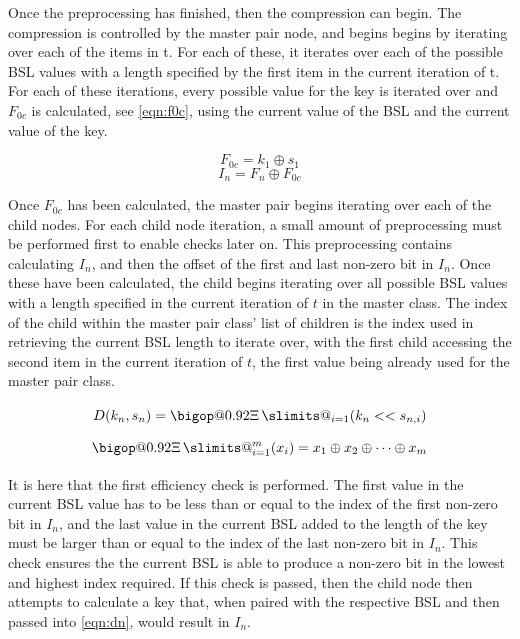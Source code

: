 \documentclass{hehe}
\makeatletter
\DeclareRobustCommand\bigop[2][1]{%
  \mathop{\vphantom{\sum}\mathpalette\bigop@{{#1}{#2}}}\slimits@
}
\newcommand{\bigop@}[2]{\bigop@@#1#2}
\newcommand{\bigop@@}[3]{%
  \vcenter{%
    \sbox\z@{$#1\sum$}%
    \hbox{\resizebox{\ifx#1\displaystyle#2\fi\dimexpr\ht\z@+\dp\z@}{!}{$\m@th#3$}}%
  }%
}
\newcommand{\XORsum}{\DOTSB\bigop[0.92]{\Xi}}
\makeatother
\begin{document}
Once the preprocessing has finished, then the compression can begin. The compression is controlled by the master pair node, and begins begins by iterating over each of the items in t. For each of these, it iterates over each of the possible BSL values with a length specified by the first item in the current iteration of t. For each of these iterations, every possible value for the key is iterated over and $F_{0c}$ is calculated, see \cref{eqn:f0c}, using the current value of the BSL and the current value of the key.

\begin{equation}\label{eqn:f0c}
  F_{0c}=k_1\oplus s_1
\end{equation}
\begin{equation}\label{eqn:in}
  I_n=F_n\oplus F_{0c}
\end{equation}

Once $F_{0c}$ has been calculated, the master pair begins iterating over each of the child nodes. For each child node iteration, a small amount of preprocessing must be performed first to enable checks later on. This preprocessing contains calculating $I_n$, and then the offset of the first and last non-zero bit in $I_n$. Once these have been calculated, the child begins iterating over all possible BSL values with a length specified in the current iteration of $t$ in the master class. The index of the child within the master pair class' list of children is the index used in retrieving the current BSL length to iterate over, with the first child accessing the second item in the current iteration of $t$, the first value being already used for the master pair class.

\begin{equation}\label{eqn:dn}
  D(k_n,s_n)=\XORsum_{i=1}(k_n << s_{n,i})
\end{equation}
\begin{equation}\label{eqn:xorSumExplain}
  \XORsum_{i=1}^m(x_i)=x_1\oplus x_2\oplus \dots \oplus x_m
\end{equation}

It is here that the first efficiency check is performed. The first value in the current BSL value has to be less than or equal to the index of the first non-zero bit in $I_n$, and the last value in the current BSL added to the length of the key must be larger than or equal to the index of the last non-zero bit in $I_n$. This check ensures the the current BSL is able to produce a non-zero bit in the lowest and highest index required. If this check is passed, then the child node then attempts to calculate a key that, when paired with the respective BSL and then passed into \cref{eqn:dn}, would result in $I_n$.
\end{document}
